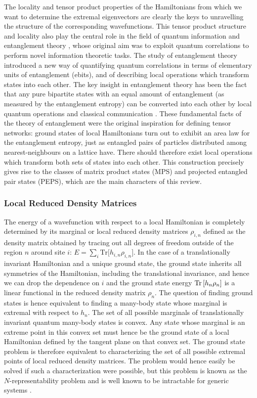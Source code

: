 \documentclass[rmp,aps,reprint,superscriptaddress,nobalancelastpage]{revtex4-1}
\begin{document}
The locality and tensor product properties of the Hamiltonians from which we want to determine the extremal eigenvectors are clearly the keys to unravelling the structure of the corresponding wavefunctions. This tensor product structure and locality also play the central role in the field of quantum information \cite{nielsen-chuang} and entanglement theory \cite{horodecki:rmp-entanglement}, whose original aim was to exploit quantum correlations to perform novel information theoretic tasks. The study of entanglement theory introduced a new way of quantifying quantum correlations in terms of elementary units of entanglement (ebits), and of describing local operations which transform states into each other. The key insight in entanglement theory has been the fact that any pure bipartite states with an equal amount of entanglement (as measured by the entanglement entropy) can be converted into each other by local quantum operations and classical communication \cite{bennett1996concentrating}. These fundamental facts of the theory of entanglement were the original inspiration for defining tensor networks: ground states of local Hamiltonians turn out to exhibit an area law for the entanglement entropy, just as entangled pairs of particles distributed among nearest-neighbours on a lattice have. There should therefore exist local operations which transform both sets of states into each other. This construction precisely gives rise to the classes of matrix product states (MPS) and projected entangled pair states (PEPS), which are the main characters of this review.


\subsubsection{Local Reduced Density Matrices}

The energy of a wavefunction with respect to a local Hamiltonian is completely determined by its marginal or local reduced density matrices $\rho_{i,n}$ defined as the density matrix obtained by tracing out all degrees of freedom outside of the region $n$ around site $i$:  $E=\sum_i\mathrm{ Tr}\big[h_{i,n}\rho_{i,n}\big]$. In the case of a translationally invariant Hamiltonian and a unique ground state, the ground state inherits all symmetries of the Hamiltonian, including the translational invariance, and hence we can drop the dependence on $i$ and the ground state energy
${\rm Tr}\left[h_n\rho_n\right]$
is a linear functional in the reduced density matrix $\rho_n$.
The question of finding ground states is hence equivalent to finding a many-body state whose marginal is extremal with respect to $h_n$. The set of all possible marginals of translationally invariant quantum many-body states is  convex. Any state whose marginal is an extreme point in this convex  set  must hence be the ground state of a local Hamiltonian defined by the tangent plane on that convex set.  The ground state problem is therefore equivalent to characterizing the set of all possible extremal points of local reduced density matrices. The problem would hence easily be solved if such a characterization were possible, but  this problem is known as the $N$-representability problem \cite{coleman1972necessary} and is well known to be intractable for generic systems \cite{liu:n-rep-qma}.
\end{document}
